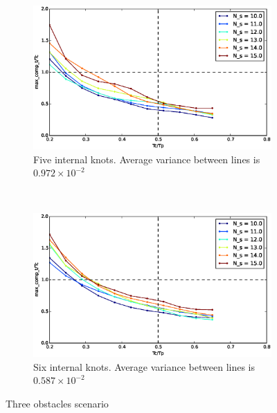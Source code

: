 \documentclass[eprint]{actapoly}
\begin{document}
\begin{figure}[!h]
        ~ %
        \begin{subfigure}[b]{0.48\textwidth}
                \includegraphics[width=\textwidth]{./images/realtime/Scenario_3__N_knots_5/mcttc-tctp.eps}
                \caption{Five internal knots. Average variance between lines is $0.972\times 10^{-2}$}\label{fig:uni35}
        \end{subfigure}
        ~ %
        \begin{subfigure}[b]{0.48\textwidth}
                \includegraphics[width=\textwidth]{./images/realtime/Scenario_3__N_knots_6/mcttc-tctp.eps}
                \caption{Six internal knots. Average variance between lines is $0.587\times 10^{-2}$}\label{fig:uni36}
        \end{subfigure}
        \caption{Three obstacles scenario}\label{fig:uni3}
\end{figure}
\end{document}
